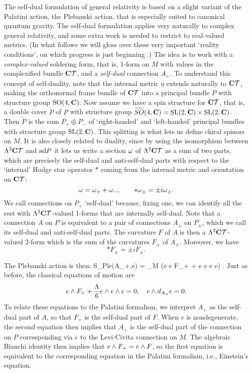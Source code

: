 The self-dual formulation of general relativity is based on a slight
variant of the Palatini action, the Plebanski action, that is especially
suited to canonical quantum gravity.  The self-dual formulation applies
very naturally to complex general relativity, and some extra work is
needed to restrict to real-valued metrics.  (In what follows we will
gloss over these very important `reality conditions', on which progress
is just beginning \cite{Ashtekar2.5,ALMMT}.)  The idea is to work with a {\it
complex-valued} soldering form, that is, 1-form on $M$ with values in
the complexified bundle $\C\T$, and a {\it self-dual} connection $A_+$.
To understand this concept of self-duality, note that the internal
metric $\eta$ extends naturally to $\C\T$, making the orthonormal frame
bundle of $\C\T$ into a principal bundle $P$ with structure group
${\rm SO}(4,{\bf C})$.  Now assume we have a spin structure for $\C\T$, that is, a
double cover $\tilde P$ of $P$ with structure group
$\widetilde{SO}(4,{\bf C}) = {\rm SL}(2,{\bf C}) \times {\rm SL}(2,{\bf C})$.  Then $\tilde P$ is
the sum $P_+ \oplus P_-$ of `right-handed' and `left-handed' principal
bundles with structure group ${\rm SL}(2,{\bf C})$.  This splitting is what lets
us define chiral spinors on $M$.  It is also closely related to duality,
since by using the isomorphism between $\Lambda^2 \C\T$ and ${\rm ad} P$ it
lets us write a section $\omega$ of $\Lambda^2 \C\T$ as a sum of two parts,
which are precisely the self-dual and anti-self-dual parts with respect
to the `internal' Hodge star operator $\ast$ coming from the internal
metric and orientation on $\C\T$:
\[           \omega = \omega_+ + \omega_-, \qquad  \ast \omega_{\pm} = \pm i
\omega_{\pm} .\]
We call connections on $P_+$ `self-dual' because, fixing one, we can
identify all the rest with $\Lambda^2 \C\T$-valued 1-forms
that are internally self-dual.  Note that a connection $A$ on $P$ is
equivalent to a pair of connections $A_{\pm}$ on $P_{\pm}$, which we
call its self-dual and anti-self-dual parts.  The curvature $F$ of $A$
is then a $\Lambda^2 \C\T$-valued 2-form which is the sum of the
curvatures $F_\pm$ of $A_\pm$.  Moreover, we have
\[         \ast F_{\pm} = \pm i F_{\pm} .\]

The Plebanski action is then:
\be           S_{Ple}(A_+,e) = \int_M \tr(e \we e \we F_+ +
{\Lambda{}} e \we e \we e \we e) \label{Pleaction}. \ee
Just as before, the classical equations of motion are
\[  e \wedge F_+ + {\Lambda \over 6} e \wedge e \wedge e = 0,
\quad e \wedge d_{A_+} e =
0.\]
To relate these equations to the Palatini formalism, we interpret
$A_+$ as the self-dual part of $A$, so that $F_+$ is the self-dual part
of $F$.  When $e$ is nondegenerate, the second equation
then implies that $A_+$ is the self-dual part of the connection on
$P$ corresponding via $e$ to the Levi-Civita connection on $M$.
The algebraic Bianchi identity then implies that $e \wedge F_+ = e \wedge
F$, so the first equation is equivalent to the corresponding equation in
the Palatini formalism, i.e., Einstein's equation.

